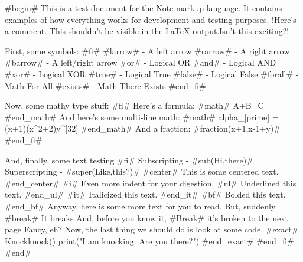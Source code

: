 
#begin#
This is a test document for the Note markup language. It contains examples of how everything works for development and testing purposes.
!Here's a comment. This shouldn't be visible in the LaTeX output.Isn't this exciting?\!!

First, some symbols:
#fi#
	#larrow# - A left arrow
	#rarrow# - A right arrow
	#barrow# - A left/right arrow
	#or# - Logical OR
	#and# - Logical AND
	#xor# - Logical XOR
	#true# - Logical True
	#false# - Logical False
	#forall# - Math For All
	#exists# - Math There Exists
#end_fi#

Now, some mathy type stuff:
#fi#
	Here's a formula: #math# A+B=C #end_math#
	And here's some multi-line math:
	#math#
		alpha_[prime] = (x+1)(x^2+2)y^[32]
	#end_math#
	And a fraction: #fraction(x+1,x-1+y)#
#end_fi#

And, finally, some text testing
#fi#
	Subscripting - #sub(Hi,there)#
	Superscripting - #super(Like,this?)#
	#center#
	This is some centered text.
	#end_center#
	#i# Even more indent for your digestion.
	#ul#
	Underlined this text.
	#end_ul#
	#it#
	Italicized this text.
	#end_it#
	#bf#
	Bolded this text.
	#end_bf#
	Anyway, here is some more text for you to read. But, suddenly\! #break# It breaks\! And, before you know it, 
	#Break#
	it's broken to the next page\! Fancy, eh?
	Now, the last thing we should do is look at some code.
	#exact#
	Knockknock(){
		print("I am knocking. Are you there?")
	}
	#end_exact#
#end_fi#
#end#
